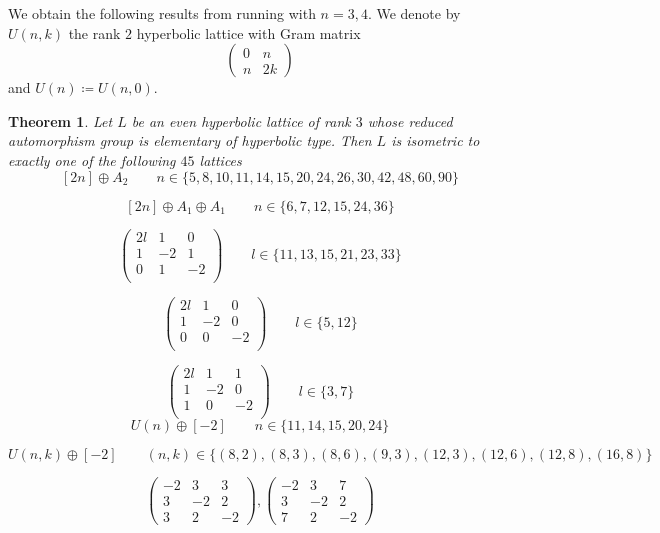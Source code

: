 \documentclass[11pt,letterpaper]{amsart}
\newtheorem{theorem}{Theorem}[section]
\theoremstyle{definition}
\theoremstyle{remark}
\begin{document}
We obtain the following results from running  with $n=3,4$. We denote by $U(n,k)$ the rank $2$ hyperbolic lattice with Gram matrix
$$\begin{pmatrix}
    0 &n\\
    n &2k
\end{pmatrix}$$
and $U(n)\coloneqq U(n,0)$.

\begin{theorem} \label{thm:classification.3}
    Let $L$ be an even hyperbolic lattice of rank $3$ whose reduced automorphism group is elementary of hyperbolic type. Then $L$ is isometric to exactly one of the following $45$ lattices
    \[[2n] \oplus A_2 \qquad n \in \{5, 8, 10, 11, 14, 15, 20, 24, 26, 30, 42, 48, 60, 90\}\]
    
    \[[2n]\oplus A_1 \oplus A_1 \qquad n \in \{6, 7, 12, 15, 24, 36\}\]
    
    \[\begin{pmatrix}
        2l & 1 & 0\\
        1 & -2 & 1\\
        0 & 1 & -2\\
    \end{pmatrix} \qquad l\in \{11, 13, 15, 21, 23, 33\}\]
    
     \[\begin{pmatrix}
        2l & 1 & 0\\
        1 & -2 & 0\\
        0 & 0 & -2\\
    \end{pmatrix} \qquad l\in \{5,12\}\] %
     
     \[\begin{pmatrix}
        2l & 1 & 1\\
        1 & -2 & 0\\
        1 & 0 & -2\\
    \end{pmatrix} \qquad l\in \{3,7\}\] %
    \[U(n) \oplus [-2] \qquad n \in \{11,14,15,20,24\}\]

    \[U(n,k)\oplus [-2] \qquad (n,k) \in \{(8,2),(8,3),(8,6),(9,3),(12,3),(12,6),(12,8),(16,8)\}\]

    \[\begin{pmatrix}
        -2&3&3 \\
        3& -2 &2 \\
        3&  2& -2 
    \end{pmatrix},\begin{pmatrix}
        -2&3&7 \\
        3& -2 &2 \\
        7&  2& -2 
    \end{pmatrix}\]
\end{theorem}
\end{document}
